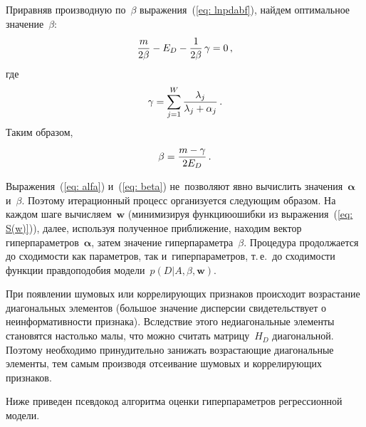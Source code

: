 \begin{multicols}{2}
Приравняв производную по~$\beta$ выражения~(\ref{eq: lnpdabf}), найдем оптимальное 
значение~$\beta$:
$$
\displaystyle\frac{\displaystyle m\mathstrut}{\displaystyle 2\beta\mathstrut}-E_D-\displaystyle\frac{\displaystyle 1\mathstrut}{\displaystyle 2\beta\mathstrut}\,\gamma=0\,,
$$
где
$$
\gamma=\sum\limits_{j=1}^W \displaystyle\frac{\displaystyle \lambda_j\mathstrut}{\displaystyle \lambda_j + \alpha_j\mathstrut}\,.
$$
Таким образом,
\begin{equation}
\label {eq: beta}
\beta=\displaystyle\frac{\displaystyle m-\gamma\mathstrut}{\displaystyle 2E_D\mathstrut}\,.
\end{equation}

Выражения~(\ref{eq: alfa}) и~(\ref{eq: beta}) не~позволяют явно вы\-чис\-лить 
значения~$\boldsymbol{\alpha}$ и~$\beta$. Поэтому итерационный процесс 
организуется следующим образом. На каж\-дом шаге вычисляем~$\mathbf{w}$ 
(минимизируя функцию\linebreak ошибки из выражения~(\ref{eq: S(w)})), далее, 
используя полученное приближение, находим вектор гиперпараметров~$\boldsymbol{\alpha}$, 
затем значение гиперпараметра~$\beta$. \mbox{Процедура} продолжается до сходимости как па\-ра\-мет\-ров, 
так и~гиперпараметров, т.\,е.\ до сходимости функции правдоподобия 
модели~$p(D|A,\beta,\mathbf{w})$.

При появлении шумовых или коррелирующих признаков происходит возрастание диагональных 
элементов (большое значение дисперсии свидетельствует о неинформативности признака). 
Вследствие этого недиагональные элементы становятся настолько малы, что можно считать 
матрицу~$H_D$ диагональной. Поэтому необходимо принудительно занижать возрастающие 
диагональные элементы, тем самым производя отсеивание шумовых и коррелирующих признаков.

Ниже приведен псевдокод алгоритма оценки гиперпараметров регрессионной модели.


\end{multicols}
